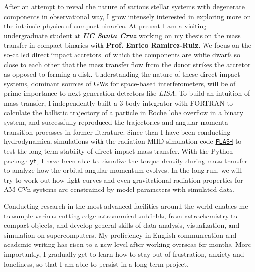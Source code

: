 After an attempt to reveal the nature of various stellar systems with degenerate components in observational way, I grow intensely interested in exploring more on the intrinsic physics of compact binaries. At present I am a visiting undergraduate student at \textbf{\textit{UC Santa Cruz}} working on my thesis on the mass transfer in compact binaries with \textbf{Prof. Enrico Ramirez-Ruiz}. We focus on the so-called direct impact accretors, of which the components are white dwarfs so close to each other that the mass transfer flow from the donor strikes the accretor as opposed to forming a disk. Understanding the nature of these direct impact systems, dominant sources of GWs for space-based interferometers, will be of prime importance to next-generation detectors like \textit{LISA}. To build an intuition of mass transfer, I independently built a 3-body integrator with FORTRAN to calculate the ballistic trajectory of a particle in Roche lobe overflow in a binary system, and successfully reproduced the trajectories and angular momenta transition processes in former literature. Since then I have been conducting hydrodynamical simulations with the radiation MHD simulation code \href{http://flash.uchicago.edu/site/}{\texttt{FLASH}} to test the long-term stability of direct impact mass transfer. With the Python package \href{https://yt-project.org}{\texttt{yt}}, I have been able to visualize the torque density during mass transfer to analyze how the orbital angular momentum evolves. In the long run, we will try to work out how light curves and even gravitational radiation properties for AM CVn systems are constrained by model parameters with simulated data.

Conducting research in the most advanced facilities around the world enables me to sample various cutting-edge astronomical subfields, from astrochemistry to compact objects, and develop general skills of data analysis, visualization, and simulation on supercomputers. My proficiency in English communication and academic writing has risen to a new level after working overseas for months. More importantly, I gradually get to learn how to stay out of frustration, anxiety and loneliness, so that I am able to persist in a long-term project.
